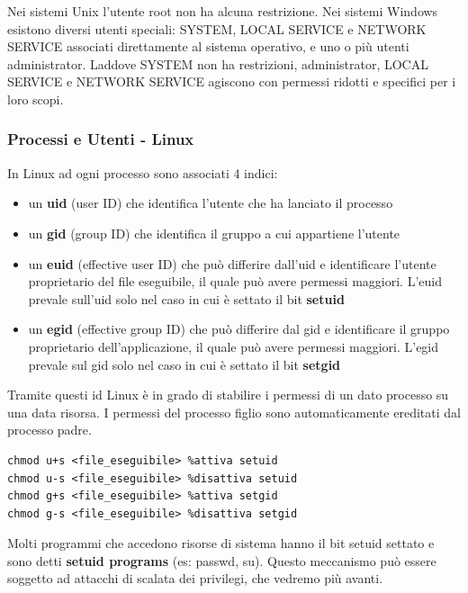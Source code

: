 Nei sistemi Unix l'utente root non ha alcuna restrizione. Nei sistemi Windows esistono diversi utenti speciali: SYSTEM, LOCAL SERVICE e NETWORK SERVICE associati direttamente al sistema operativo, e uno o più utenti administrator. Laddove SYSTEM non ha restrizioni, administrator, LOCAL SERVICE e NETWORK SERVICE agiscono con permessi ridotti e specifici per i loro scopi. 

\subsubsection{Processi e Utenti - Linux}
In Linux ad ogni processo sono associati 4 indici:
\begin{itemize}
  \item un \textbf{uid} (user ID) che identifica l'utente che ha lanciato il processo
  \item un \textbf{gid} (group ID) che identifica il gruppo a cui appartiene l'utente
  \item un \textbf{euid} (effective user ID) che può differire dall'uid e identificare l'utente proprietario del file eseguibile, il quale può avere permessi maggiori. L'euid prevale sull'uid solo nel caso in cui è settato il bit \textbf{setuid}
  \item un \textbf{egid} (effective group ID) che può differire dal gid e identificare il gruppo proprietario dell'applicazione, il quale può avere permessi maggiori. L'egid prevale sul gid solo nel caso in cui è settato il bit \textbf{setgid}
\end{itemize}
Tramite questi id Linux è in grado di stabilire i permessi di un dato processo su una data risorsa. I permessi del processo figlio sono automaticamente ereditati dal processo padre.
\begin{algorithm}
\begin{lstlisting}[caption={Esempio forking in C}]
chmod u+s <file_eseguibile> %attiva setuid
chmod u-s <file_eseguibile> %disattiva setuid
chmod g+s <file_eseguibile> %attiva setgid
chmod g-s <file_eseguibile> %disattiva setgid
\end{lstlisting}
\end{algorithm}
Molti programmi che accedono risorse di sistema hanno il bit setuid settato e sono detti \textbf{setuid programs} (es: passwd, su). Questo meccanismo può essere soggetto ad attacchi di scalata dei privilegi, che vedremo più avanti. \newline 

